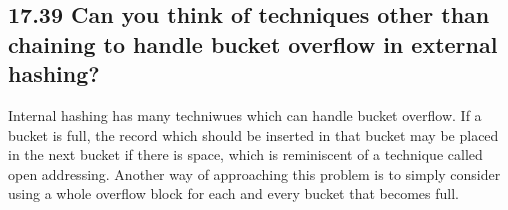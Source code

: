 \subsection*{17.39 Can you think of techniques other than chaining to handle bucket overflow in external hashing?}
Internal hashing has many techniwues which can handle bucket overflow. If a bucket is full, the record which should be inserted in that bucket may be placed in the next bucket if there is space, which is reminiscent of a technique called open addressing. Another way of approaching this problem is to simply consider using a whole overflow block for each and every bucket that becomes full.